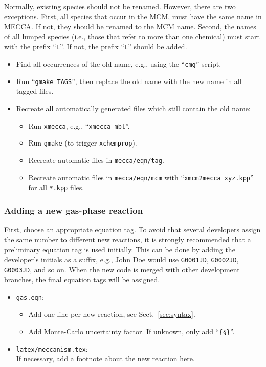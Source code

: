 \documentclass[a4paper,twoside]{article}
\newcommand{\I}[1]{\index{#1}}
\begin{document}
Normally, existing species should not be renamed. However, there are two
exceptions. First, all species that occur in the MCM, must have the same
name in MECCA. If not, they should be renamed to the MCM name. Second,
the names of all lumped species (i.e., those that refer to more than one
chemical) must start with the prefix ``\verb|L|''. If not, the prefix
``\verb|L|'' should be added.

\begin{itemize}
\item Find all occurrences of the old name, e.g., using the
  ``\verb|cmg|'' script.
\item Run ``\verb|gmake TAGS|'', then replace the old name with the new
  name in all tagged files.
\item Recreate all automatically generated files which still contain the
  old name:
  \begin{itemize}
  \item Run \verb|xmecca|, e.g., ``\verb|xmecca mbl|''.
  \item Run \verb|gmake| (to trigger \verb|xchemprop|).
  \item Recreate automatic files in \verb|mecca/eqn/tag|.
  \item Recreate automatic files in \verb|mecca/eqn/mcm| with
  ``\verb|xmcm2mecca xyz.kpp|'' for all \verb|*.kpp| files.
  \end{itemize}
\end{itemize}

\subsubsection{Adding a new \I{gas phase}gas-phase reaction}
\label{sec:addgprxn}

First, choose an appropriate equation tag. To avoid that several
developers assign the same number to different new reactions, it is
strongly recommended that a preliminary equation tag is used initially.
This can be done by adding the developer's initials as a suffix, e.g.,
John Doe would use \verb|G0001JD|, \verb|G0002JD|, \verb|G0003JD|, and
so on. When the new code is merged with other development branches, the
final equation tags will be assigned.

\begin{itemize}
\item \I{equation file}\verb|gas.eqn|:
  \begin{itemize}
  \item Add one line per new reaction, see Sect.~\ref{sec:syntax}.
  \item Add Monte-Carlo uncertainty factor. If unknown, only add
    ``\I{$\mathsection$ (in {\tt *.eqn} file)}\verb|{§}|''.
  \end{itemize}
\item \verb|latex/meccanism.tex|:\\
  If necessary, add a footnote about the new reaction here.
\end{itemize}
\end{document}
